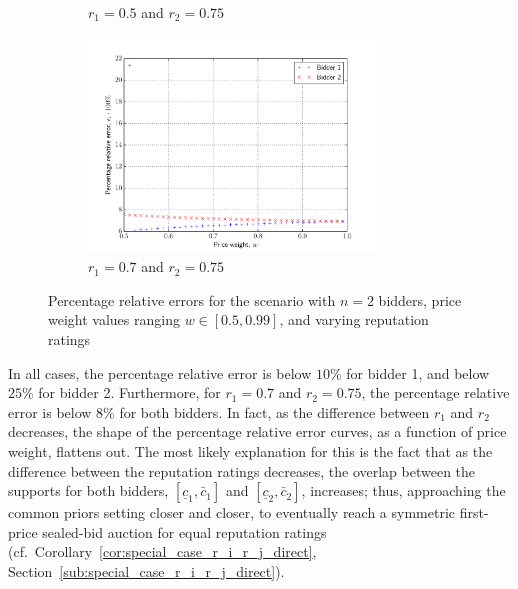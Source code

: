 \begin{figure}[p!]
\begin{subfigure}[b]{0.5\textwidth}
    \caption{$r_1=0.5$ and $r_2=0.75$}
    \label{fig:compare_2_bidders_050_075_approximation}
  \end{subfigure}
  \begin{subfigure}[b]{0.5\textwidth}
    \includegraphics[width=3in]{Approximation/Figures/compare_2_bidders_070_075}
    \caption{$r_1=0.7$ and $r_2=0.75$}
    \label{fig:compare_2_bidders_070_075_approximation}
  \end{subfigure}
  \caption{Percentage relative errors for the scenario with $n=2$ bidders, price weight values ranging $w\in[0.5,0.99]$, and varying reputation ratings}
  \label{fig:compare_2_bidders_approximation}
\end{figure}

In all cases, the percentage relative error is below $10\%$ for bidder 1, and below $25\%$ for bidder 2. Furthermore, for $r_1=0.7$ and $r_2=0.75$, the percentage relative error is below $8\%$ for both bidders. In fact, as the difference between $r_1$ and $r_2$ decreases, the shape of the percentage relative error curves, as a function of price weight, flattens out. The most likely explanation for this is the fact that as the difference between the reputation ratings decreases, the overlap between the supports for both bidders, $[\underline{c}_1, \bar{c}_1]$ and $[\underline{c}_2, \bar{c}_2]$, increases; thus, approaching the common priors setting closer and closer, to eventually reach a symmetric first-price sealed-bid auction for equal reputation ratings (cf.~Corollary~\ref{cor:special_case_r_i_r_j_direct}, Section~\ref{sub:special_case_r_i_r_j_direct}).

